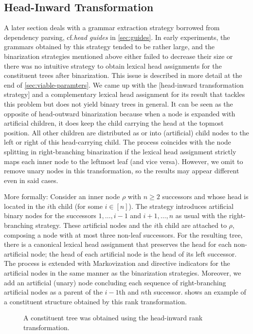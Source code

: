 \documentclass[../../document.tex]{subfiles}
\begin{document}
    \subsection{Head-Inward Transformation} \label{sec:extraction:bin:hi}
    A later section deals with a grammar extraction strategy borrowed from dependency parsing, cf.\@ \emph{head guides} in \cref{sec:guides}.
    In early experiments, the grammars obtained by this strategy tended to be rather large, and the binarization strategies mentioned above either failed to decrease their size or there was no intuitive strategy to obtain lexical head assignments for the constituent trees after binarization.
    This issue is described in more detail at the end of \cref{sec:viable-paramters}.
    We came up with the [head-inward transformation strategy] and a complementary lexical head assignment for its result that tackles this problem but does not yield binary trees in general.
    It can be seen as the opposite of head-outward binarization because when a node is expanded with artificial children, it does keep the child carrying the head at the topmost position.
    All other children are distributed as or into (artificial) child nodes to the left or right of this head-carrying child.
    The process coincides with the node splitting in right-branching binarization if the lexical head assignment strictly maps each inner node to the leftmost leaf (and vice versa).
    However, we omit to remove unary nodes in this transformation, so the results may appear different even in said cases.

    More formally:  
        Consider an inner node \(\rho\) with \(n \geq 2\) successors and whose head is located in the \(i\)th child (for some \(i \in [n]\)).
        The strategy introduces artificial binary nodes for the successors \(1, \ldots, i-1\) and \(i+1, \ldots, n\) as usual with the right-branching strategy.
    These artificial nodes and the \(i\)th child are attached to \(\rho\), composing a node with at most three non-leaf successors.
    For the resulting tree, there is a canonical lexical head assignment that preserves the head for each non-artificial node; the head of each artificial node is the head of its left successor.
    The process is extended with Markovization and directive indicators for the artificial nodes in the same manner as the binarization strategies.
    Moreover, we add an artificial (unary) node concluding each sequence of right-branching artificial nodes as a parent of the \(i-1\)th and \(n\)th successor.
     shows an example of a constituent structure obtained by this rank transformation.

    \begin{figure}
        \centering
        
        \caption{\label{fig:ex:head-inward}
            A constituent tree was obtained using the head-inward rank transformation.
        }
    \end{figure}


    \ifSubfilesClassLoaded{%
        \printindex
    }{}
\end{document}

